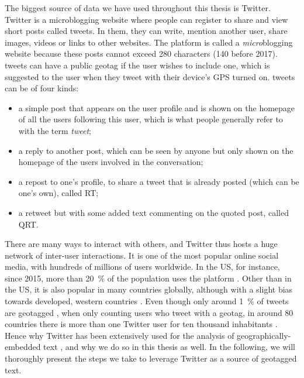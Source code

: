 \documentclass[../thesis.tex]{subfiles}
\begin{document}
The biggest source of data we have used throughout this thesis is Twitter. Twitter is a
microblogging website where people can register to share and view short posts called
tweets. In them, they can write, mention another user, share images, videos or links to
other websites. The platform is called a \emph{micro}blogging website because these
posts cannot exceed 280 characters (140 before 2017). tweets
can have a public geotag if the user wishes to include one, which is suggested to the
user when they tweet with their device's GPS turned on. tweets can be of four kinds:
\begin{itemize}
  \item a simple post that appears on the user profile and is shown on the homepage of
  all the users following this user, which is what people generally refer to with the
  term \emph{tweet};
  \item a reply to another post, which can be seen by anyone but only shown on the
  homepage of the users involved in the conversation;
  \item a repost to one's profile, to share a tweet that is already posted (which can be
  one's own), called \ac{RT};
  \item a retweet but with some added text commenting on the quoted post, called
  \ac{QRT}.
\end{itemize}
There are many ways to interact with others, and Twitter thus hosts a huge network of
inter-user interactions. It is one of the most popular online social media, with
hundreds of millions of users worldwide. In the US, for instance, since 2015, more than
\SI{20}{\percent} of the population uses the platform \cite{AuxierSocialMedia2021}. Other
than in the US, it is also popular in many countries globally, although with a slight
bias towards developed, western countries \cite{HawelkaGeolocatedTwitter2014}. Even
though only around \SI{1}{\percent} of tweets are geotagged
\cite{MorstatterSampleGood2021}, when only counting users who tweet with a geotag, in
around 80 countries there is more than one Twitter user for ten thousand inhabitants
\cite{MocanuTwitterBabel2013}. Hence why Twitter has been extensively used for the
analysis of geographically-embedded text
\cite{ArthurHumanGeography2019,BokanyiRaceReligion2016,BokanyiScalingWords2019,GoncalvesCrowdsourcingDialect2014,GoncalvesLearningSpanish2016,GoncalvesMappingAmericanization2018,
GrieveMappingLexical2019,HuangUnderstandingRegional2016,KoyluUncoveringGeoSocial2018,MocanuTwitterBabel2013,NguyenAudienceUse2015,LamannaImmigrantCommunity2018},
and why we do so in this thesis as well. In the following, we will thoroughly present the
steps we take to leverage Twitter as a source of geotagged text.
\end{document}
